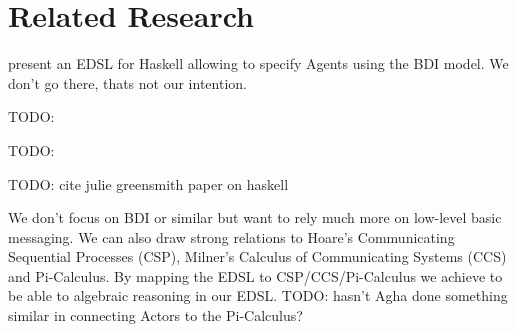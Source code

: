 \section{Related Research}

\cite{sulzmann_specifying_2007} present an EDSL for Haskell allowing to specify Agents using the BDI model. We don't go there, thats not our intention. 

TODO: \cite{schneider_towards_2012}

TODO: \cite{vendrov_frabjous:_2014}


TODO: cite julie greensmith paper on haskell

We don't focus on BDI or similar but want to rely much more on low-level basic messaging. We can also draw strong relations to Hoare's Communicating Sequential Processes (CSP), Milner's Calculus of Communicating Systems (CCS) and Pi-Calculus. By mapping the EDSL to CSP/CCS/Pi-Calculus we achieve to be able to algebraic reasoning in our EDSL. TODO: hasn't Agha done something similar in connecting Actors to the Pi-Calculus?